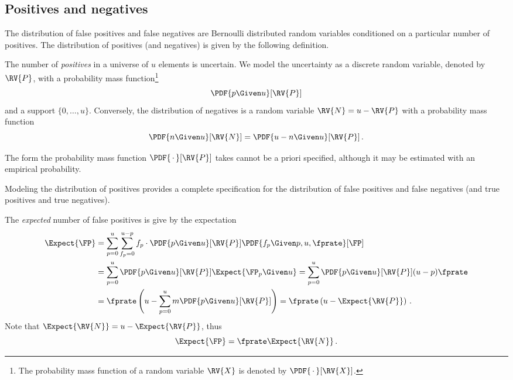 \subsection{Positives and negatives}
The distribution of false positives and false negatives are Bernoulli distributed random variables conditioned on a particular number of positives. The distribution of positives (and negatives) is given by the following definition.
\begin{definition}
The number of \emph{positives} in a universe of $u$ elements is uncertain. We model the uncertainty as a discrete random variable, denoted by $\RV{P}$, with a probability mass function\footnote{The probability mass function of a random variable $\RV{X}$ is denoted by $\PDF{\,\cdot\,}[\RV{X}]$.}
\begin{equation}
    \PDF{p \Given u}[\RV{P}]
\end{equation}
and a support $\{0,\ldots,u\}$. Conversely, the distribution of negatives is a random variable $\RV{N} = u - \RV{P}$ with a probability mass function
\begin{equation}
    \PDF{n \Given u}[\RV{N}] = \PDF{u - n \Given u}[\RV{P}]\,.
\end{equation}
\end{definition}
The form the probability mass function $\PDF{\,\cdot\,}[\RV{P}]$ takes cannot be a priori specified, although it may be estimated with an empirical probability.

Modeling the distribution of positives provides a complete specification for the distribution of false positives and false negatives (and true positives and true negatives).
\begin{example}
The \emph{expected} number of false positives is give by the expectation
\begin{align}
    \Expect{\FP}
        &= \sum_{p=0}^{u} \sum_{f_p=0}^{u - p} f_p \cdot \PDF{p \Given u}[\RV{P}] \PDF{f_p \Given p, u, \fprate}[\FP]\\
        &= \sum_{p=0}^{u} \PDF{p \Given u}[\RV{P}] \Expect{\FP_p \Given u} = \sum_{p=0}^{u} \PDF{p \Given u}[\RV{P}](u-p) \fprate\\
        &= \fprate\left(u - \sum_{p=0}^{u} m \PDF{p \Given u}[\RV{P}]\right) = \fprate\left(u - \Expect{\RV{P}}\right)\,.
\end{align}
Note that $\Expect{\RV{N}} = u - \Expect{\RV{P}}$, thus
\begin{equation}
    \Expect{\FP} = \fprate \Expect{\RV{N}}\,.
\end{equation}
\end{example}
